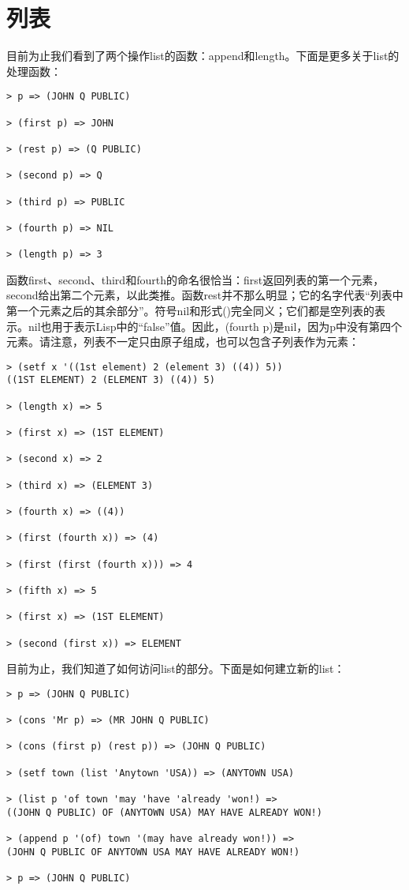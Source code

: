 \section{列表}
目前为止我们看到了两个操作list的函数：append和length。下面是更多关于list的处理函数：
\begin{lstlisting}[frame=shadowbox]
> p => (JOHN Q PUBLIC)

> (first p) => JOHN

> (rest p) => (Q PUBLIC)

> (second p) => Q

> (third p) => PUBLIC

> (fourth p) => NIL

> (length p) => 3
\end{lstlisting}

函数first、second、third和fourth的命名很恰当：first返回列表的第一个元素，second给出第二个元素，以此类推。函数rest并不那么明显；它的名字代表“列表中第一个元素之后的其余部分”。符号nil和形式()完全同义；它们都是空列表的表示。nil也用于表示Lisp中的“false”值。因此，(fourth p)是nil，因为p中没有第四个元素。请注意，列表不一定只由原子组成，也可以包含子列表作为元素：

\begin{lstlisting}[frame=shadowbox]
> (setf x '((1st element) 2 (element 3) ((4)) 5))
((1ST ELEMENT) 2 (ELEMENT 3) ((4)) 5)

> (length x) => 5

> (first x) => (1ST ELEMENT)

> (second x) => 2

> (third x) => (ELEMENT 3)

> (fourth x) => ((4))

> (first (fourth x)) => (4)

> (first (first (fourth x))) => 4

> (fifth x) => 5

> (first x) => (1ST ELEMENT)

> (second (first x)) => ELEMENT
\end{lstlisting}

目前为止，我们知道了如何访问list的部分。下面是如何建立新的list：
\begin{lstlisting}[frame=shadowbox]
> p => (JOHN Q PUBLIC)

> (cons 'Mr p) => (MR JOHN Q PUBLIC)

> (cons (first p) (rest p)) => (JOHN Q PUBLIC)

> (setf town (list 'Anytown 'USA)) => (ANYTOWN USA)

> (list p 'of town 'may 'have 'already 'won!) =>
((JOHN Q PUBLIC) OF (ANYTOWN USA) MAY HAVE ALREADY WON!)

> (append p '(of) town '(may have already won!)) =>
(JOHN Q PUBLIC OF ANYTOWN USA MAY HAVE ALREADY WON!)

> p => (JOHN Q PUBLIC)
\end{lstlisting}

